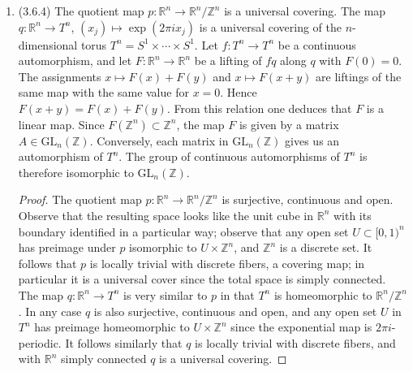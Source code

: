 \documentclass[11pt]{article}
\begin{document}
\begin{enumerate}
\begin{proof}
      We show that any open set could not be transport simple so that there could not be a covering of $\prod_1^\infty S^1$ by transport simple sets. If $U$ is open in $\prod_1^\infty S^1$, then $U$ takes on the form $\prod_1^\infty E_i$ where $E_i$ is open in $S^1$ with $E_i =S^1$ for all but finitely many indices. We show that there are loops between the same two points which are not homotopic to each other. Consider the following loops for some fixed point in $U$: Let one path be the product of full counterclockwise loops around the circle for each copy of $S^1$ and the identity for each $E_j\neq S^1$, and consider another path the product of full clockwise loops around the circle for each copy of $S^1$ and the identity for each $E_j\neq S^1$. These are two paths between the same two points (one point since they are loops), but they could not be homotopic to each other since the counterclockwise loops are not homotopic to the clockwise loops (they occupy different equivalence classes in the fundamental group). It follows that $U$ is not transport simple and hence the infinite product $\prod_1^\infty S^1$ could not be covered by transport simple sets.
    \end{proof}
    \item (3.6.4) The quotient map $p\colon\mathbb{R}^n\to \mathbb{R}^n/\mathbb{Z}^n$ is a universal covering. The map $q\colon \mathbb{R}^n\to T^n$, $(x_j)\mapsto \exp(2\pi i x_j)$ is a universal covering of the $n$-dimensional torus $T^n = S^1\times\cdots\times S^1$. Let $f\colon T^n\to T^n$ be a continuous automorphism, and let $F\colon\mathbb{R}^n\to \mathbb{R}^n$ be a lifting of $fq$ along $q$ with $F(0) = 0$. The assignments $x\mapsto F(x)+F(y)$ and $x\mapsto F(x+y)$ are liftings of the same map with the same value for $x= 0$. Hence $F(x+y) = F(x)+F(y)$. From this relation one deduces that $F$ is a linear map. Since $F(\mathbb{Z}^n)\subset \mathbb{Z}^n$, the map $F$ is given by a matrix $A\in \mathrm{GL}_n(\mathbb{Z})$. Conversely, each matrix in $\mathrm{GL}_n(\mathbb{Z})$ gives us an automorphism of $T^n$. The group of continuous automorphisms of $T^n$ is therefore isomorphic to $\mathrm{GL}_n(\mathbb{Z})$. \begin{proof}
      The quotient map $p\colon \mathbb{R}^n\to \mathbb{R}^n/\mathbb{Z}^n$ is surjective, continuous and open. Observe that the resulting space looks like the unit cube in $\mathbb{R}^n$ with its boundary identified in a particular way; observe that any open set $U\subset [0,1)^n$ has preimage under $p$ isomorphic to $U\times \mathbb{Z}^n$, and $\mathbb{Z}^n$ is a discrete set. It follows that $p$ is locally trivial with discrete fibers, a covering map; in particular it is a universal cover since the total space is simply connected. The map $q\colon\mathbb{R}^n\to T^n$ is very similar to $p$ in that $T^n$ is homeomorphic to $\mathbb{R}^n/\mathbb{Z}^n$. In any case $q$ is also surjective, continuous and open, and any open set $U$ in $T^n$ has preimage homeomorphic to $U\times \mathbb{Z}^n$ since the exponential map is $2\pi i $-periodic. It follows similarly that $q$ is locally trivial with discrete fibers, and with $\mathbb{R}^n$ simply connected $q$ is a universal covering.


\end{proof}
\end{enumerate}
\end{document}
